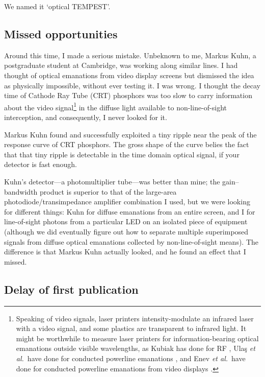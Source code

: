 \documentclass[conference]{IEEEtran}
\begin{document}
We named it `optical TEMPEST'.

\subsection{Missed opportunities}

Around this time, I made a serious mistake. Unbeknown to me, Markus Kuhn, a
postgraduate student at Cambridge, was working along similar lines. I had
thought of optical emanations from video display screens but dismissed the
idea as physically impossible, without ever testing it. I was wrong. I
thought the decay time of Cathode Ray Tube (CRT) phosphors was too slow to
carry information about the video signal\footnote{Speaking of video signals,
laser printers intensity-modulate an infrared laser with a video signal, and
some plastics are transparent to infrared light. It might be worthwhile to
measure laser printers for information-bearing optical emanations outside
visible wavelengths, as Kubiak has done for RF
\cite{Kubiak2014a,Kubiak2017b,Kubiak2017c,Kubiak2017d}, Ula\c{s} {\it et al.}\
have done for conducted powerline emanations \cite{Ulas2016}, and Enev {\it
et al.}\ have done for conducted powerline emanations from video displays
\cite{Enev2011}.} in the diffuse light available to non-line-of-sight
interception, and consequently, I never looked for it.

Markus Kuhn found and successfully exploited a tiny ripple near the peak of
the response curve of CRT phosphors. The gross shape of the curve belies the
fact that that tiny ripple is detectable in the time domain optical signal,
if your detector is fast enough.

Kuhn's detector---a photomultiplier tube---was better than mine; the
gain--bandwidth product is superior to that of the large-area
photodiode/transimpedance amplifier combination I used, but we were looking
for different things: Kuhn for diffuse emanations from an entire screen, and
I for line-of-sight photons from a particular LED on an isolated piece of
equipment (although we did eventually figure out how to separate multiple
superimposed signals from diffuse optical emanations collected by
non-line-of-sight means). The difference is that Markus Kuhn actually looked,
and he found an effect that I missed.

\subsection{Delay of first publication}
\end{document}
